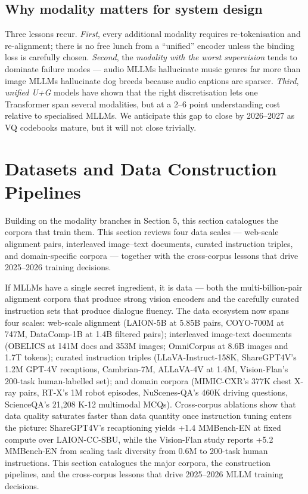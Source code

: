 \documentclass{article}
\begin{document}
\subsection{Why modality matters for system design}\label{why-modality-matters-for-system-design}

Three lessons recur. \emph{First}, every additional modality requires re-tokenisation and re-alignment; there is no free lunch from a ``unified'' encoder unless the binding loss is carefully chosen. \emph{Second}, the \emph{modality with the worst supervision} tends to dominate failure modes --- audio MLLMs hallucinate music genres far more than image MLLMs hallucinate dog breeds because audio captions are sparser. \emph{Third}, \emph{unified U+G} models have shown that the right discretisation lets one Transformer span several modalities, but at a 2--6 point understanding cost relative to specialised MLLMs. We anticipate this gap to close by 2026--2027 as VQ codebooks mature, but it will not close trivially.

\section{Datasets and Data Construction Pipelines}\label{datasets-and-data-construction-pipelines}

Building on the modality branches in Section 5, this section catalogues the corpora that train them. This section reviews four data scales --- web-scale alignment pairs, interleaved image--text documents, curated instruction triples, and domain-specific corpora --- together with the cross-corpus lessons that drive 2025--2026 training decisions.

If MLLMs have a single secret ingredient, it is data --- both the multi-billion-pair alignment corpora that produce strong vision encoders and the carefully curated instruction sets that produce dialogue fluency. The data ecosystem now spans four scales: web-scale alignment (LAION-5B at 5.85B pairs, COYO-700M at 747M, DataComp-1B at 1.4B filtered pairs); interleaved image-text documents (OBELICS at 141M docs and 353M images; OmniCorpus at 8.6B images and 1.7T tokens); curated instruction triples (LLaVA-Instruct-158K, ShareGPT4V's 1.2M GPT-4V recaptions, Cambrian-7M, ALLaVA-4V at 1.4M, Vision-Flan's 200-task human-labelled set); and domain corpora (MIMIC-CXR's 377K chest X-ray pairs, RT-X's 1M robot episodes, NuScenes-QA's 460K driving questions, ScienceQA's 21,208 K-12 multimodal MCQs). Cross-corpus ablations show that data quality saturates faster than data quantity once instruction tuning enters the picture: ShareGPT4V's recaptioning yields +1.4 MMBench-EN at fixed compute over LAION-CC-SBU, while the Vision-Flan study reports +5.2 MMBench-EN from scaling task diversity from 0.6M to 200-task human instructions. This section catalogues the major corpora, the construction pipelines, and the cross-corpus lessons that drive 2025--2026 MLLM training decisions.
\end{document}
